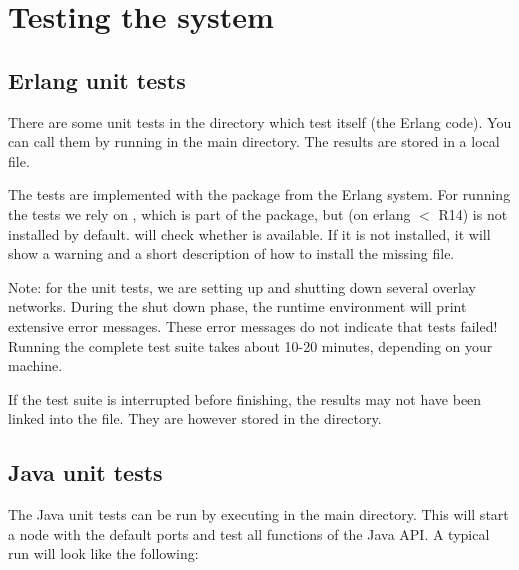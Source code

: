 \chapter{Testing the system}

\section{Erlang unit tests}
There are some unit tests in the  directory which test \scalaris{}
itself (the Erlang code). You can call them
by running  in the main directory. The results are stored
in a local  file. 

The tests are implemented with the  package from the
Erlang system. For running the tests we rely on ,
which is part of the  package, but (on erlang $<$ R14) is not
installed by default.  will check whether  is
available. If it is not installed, it will show a warning and a short
description of how to install the missing file.

Note: for the unit tests, we are setting up and shutting down several
overlay networks. During the shut down phase, the runtime environment
will print extensive error messages. These error messages do not
indicate that tests failed! Running the complete test suite takes
about 10-20 minutes, depending on your machine.

If the test suite is interrupted before finishing, the results may not have
been linked into the  file. They are however stored in the
 directory.

\section{Java unit tests}
The Java unit tests can be run by executing  in the main
directory. This will start a \scalaris{} node with the default ports and test
all functions of the Java API. A typical run will look like the
following:

